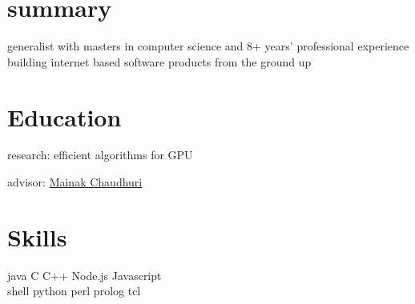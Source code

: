 
\begin{minipage}[t]{0.32\textwidth} %

\section{summary}
\location{}
generalist with masters in computer science and 8+ years' professional experience building internet based software products from the ground up
\sectionspace %

\section{Education} 
\vspace{\topsep} %
\vspace{1pt}
\begin{tightitemize}
\item research: efficient algorithms for GPU
\item advisor: \href{https://www.cse.iitk.ac.in/users/mainakc/}{Mainak Chaudhuri} 
\end{tightitemize}
\vspace{6pt}




\sectionspace %

\section{Skills}

java \textbullet{} C \textbullet{} C++ \textbullet{} Node.js \textbullet{} Javascript\\ 
shell \textbullet{} python \textbullet{} perl \textbullet{} prolog \textbullet{} tcl\\
\sectionspace %


\end{minipage}
